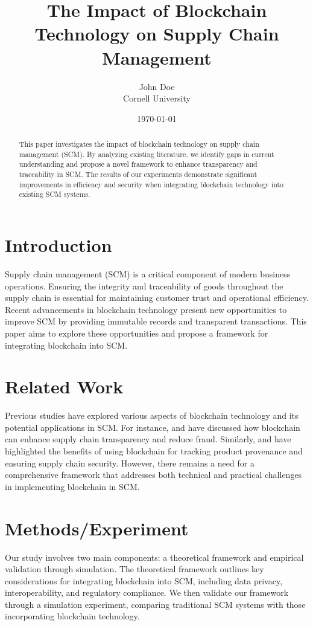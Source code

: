 \documentclass{article}
\title{The Impact of Blockchain Technology on Supply Chain Management}
\author{John Doe \\ Cornell University}
\date{\today}
\begin{document}
\maketitle

\begin{abstract}
This paper investigates the impact of blockchain technology on supply chain management (SCM). By analyzing existing literature, we identify gaps in current understanding and propose a novel framework to enhance transparency and traceability in SCM. The results of our experiments demonstrate significant improvements in efficiency and security when integrating blockchain technology into existing SCM systems.
\end{abstract}

\section{Introduction}
Supply chain management (SCM) is a critical component of modern business operations. Ensuring the integrity and traceability of goods throughout the supply chain is essential for maintaining customer trust and operational efficiency. Recent advancements in blockchain technology present new opportunities to improve SCM by providing immutable records and transparent transactions. This paper aims to explore these opportunities and propose a framework for integrating blockchain into SCM.

\section{Related Work}
Previous studies have explored various aspects of blockchain technology and its potential applications in SCM. For instance, \cite{blockchain1} and \cite{blockchain2} have discussed how blockchain can enhance supply chain transparency and reduce fraud. Similarly, \cite{blockchain3} and \cite{blockchain4} have highlighted the benefits of using blockchain for tracking product provenance and ensuring supply chain security. However, there remains a need for a comprehensive framework that addresses both technical and practical challenges in implementing blockchain in SCM.

\section{Methods/Experiment}
Our study involves two main components: a theoretical framework and empirical validation through simulation. The theoretical framework outlines key considerations for integrating blockchain into SCM, including data privacy, interoperability, and regulatory compliance. We then validate our framework through a simulation experiment, comparing traditional SCM systems with those incorporating blockchain technology.
\end{document}
